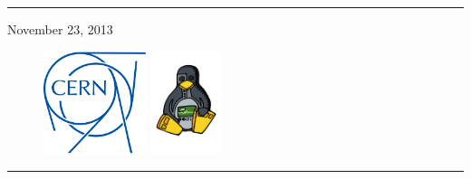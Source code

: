 \begin{titlepage}

\vspace*{3cm}


\noindent \rule{\textwidth}{.1cm}

\hfill November 23, 2013

\vspace*{3cm}

\begin{figure}[h]
  \includegraphics[height=3cm]{fig/cern-logo}
  \hfill
  \includegraphics[height=3cm]{fig/ohwr-logo}
\end{figure}

\vfill


\noindent \rule{\textwidth}{.05cm}

\end{titlepage}
